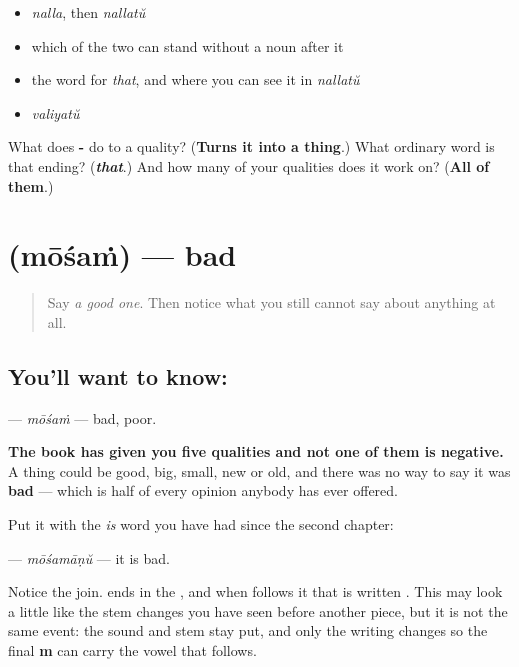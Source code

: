 \begin{itemize}
\raggedright
  \item \emph{nalla}, then \emph{nallatŭ}
  \item which of the two can stand without a noun after it
  \item the word for \emph{that}, and where you can see it in \emph{nallatŭ}
  \item \emph{valiyatŭ}
\end{itemize}

\begin{tcolorbox}[breakable,colback=teal!4,colframe=teal!35!black,title={Before you move on}]
What does \textbf{-} do to a quality? (\textbf{Turns it into a thing}.) What ordinary word is that ending? (\emph{\textbf{that}}.) And how many of your qualities does it work on? (\textbf{All of them}.)
\end{tcolorbox}
\section[\texorpdfstring{\ml{മോശം} (mōśaṁ)}{മോശം (mōśaṁ)}]{ (mōśaṁ) — bad}

\label{lesson:ML-C89-mosham}



\begin{quote}
Say \emph{a good one}. Then notice what you still cannot say about anything at all.
\end{quote}

\subsection*{You'll want to know: }
\textbf{} — \emph{mōśaṁ} — bad, poor.

\textbf{The book has given you five qualities and not one of them is negative.} A thing could be good, big, small, new or old, and there was no way to say it was \textbf{bad} — which is half of every opinion anybody has ever offered.

Put it with the \emph{is} word you have had since the second chapter:

\textbf{} — \emph{mōśamāṇŭ} — it is bad.

Notice the join. \textbf{} ends in the \textbf{}, and when \textbf{} follows it that \textbf{} is written \textbf{}. This may look a little like the stem changes you have seen before another piece, but it is not the same event: the sound and stem stay put, and only the writing changes so the final \textbf{m} can carry the vowel that follows.

